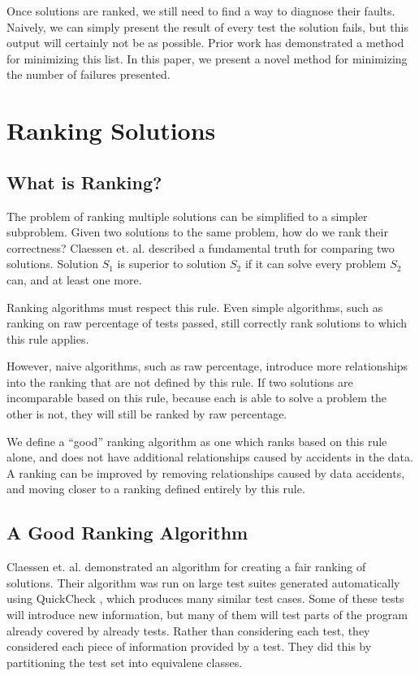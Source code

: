 \documentclass[11pt,twoside]{article}
\theoremstyle{definition}
\let\cite=\citep
\begin{document}
Once solutions are ranked, we still need to find a way to diagnose their faults. Naively, we can simply present the result of every test the solution fails, but this output will certainly not be as possible. Prior work has demonstrated a method for minimizing this list. In this paper, we present a novel method for minimizing the number of failures presented.

\section{Ranking Solutions}
\subsection{What is Ranking?}

The problem of ranking multiple solutions can be simplified to a simpler subproblem. Given two solutions to the same problem, how do we rank their correctness? Claessen et. al. \cite{Claessen} described a fundamental truth for comparing two solutions. Solution $S_1$ is superior to solution $S_2$ if it can solve every problem $S_2$ can, and at least one more.

Ranking algorithms must respect this rule. Even simple algorithms, such as ranking on raw percentage of tests passed, still correctly rank solutions to which this rule applies. 

However, naive algorithms, such as raw percentage, introduce more relationships into the ranking that are not defined by this rule. If two solutions are incomparable based on this rule, because each is able to solve a problem the other is not, they will still be ranked by raw percentage.

We define a ``good'' ranking algorithm as one which ranks based on this rule alone, and does not have additional relationships caused by accidents in the data. A ranking can be improved by removing relationships caused by data accidents, and moving closer to a ranking defined entirely by this rule.

\subsection{A Good Ranking Algorithm}
Claessen et. al. demonstrated an algorithm for creating a fair ranking of solutions\cite{Claessen}. Their algorithm was run on large test suites generated automatically using QuickCheck \cite{QuickCheck}, which produces many similar test cases. Some of these tests will introduce new information, but many of them will test parts of the program already covered by already tests. Rather than considering each test, they considered each piece of information provided by a test. They did this by partitioning the test set into equivalene classes. 
\end{document}
